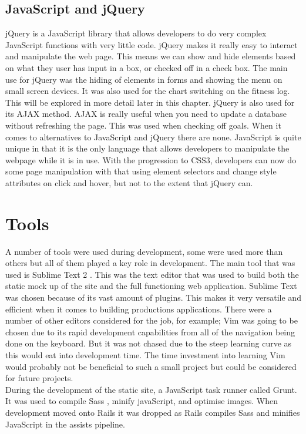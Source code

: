 \subsection{JavaScript and jQuery}
jQuery is a JavaScript library that allows developers to do very complex JavaScript functions with very little code. jQuery makes it really easy to interact and manipulate the web page. This means we can show and hide elements based on what they user has input in a box, or checked off in a check box. The main use for jQuery was the hiding of elements in forms and showing the menu on small screen devices. It was also used for the chart switching on the fitness log. This will be explored in more detail later in this chapter. jQuery is also used for its AJAX method. AJAX is really useful when you need to update a database without refreshing the page. This was used when checking off goals. When it comes to alternatives to JavaScript and jQuery there are none. JavaScript is quite unique in that it is the only language that allows developers to manipulate the webpage while it is in use. With the progression to CSS3, developers can now do some page manipulation with that using element selectors and change style attributes on click and hover, but not to the extent that jQuery can.\\

\section{Tools}
A number of tools were used during development, some were used more than others but all of them played a key role in development. The main tool that was used is Sublime Text 2 \citep{sublimetext:2011}. This was the text editor that was used to build both the static mock up of the site and the full functioning web application. Sublime Text was chosen because of its vast amount of plugins. This makes it very versatile and efficient when it comes to building productions applications. There were a number of other editors considered for the job, for example; Vim \citep{vim:2013} was going to be chosen due to its rapid development capabilities from all of the navigation being done on the keyboard. But it was not chased due to the steep learning curve as this would eat into development time. The time investment into learning Vim would probably not be beneficial to such a small project but could be considered for future projects.\\

During the development of the static site, a JavaScript task runner called Grunt. It was used to compile Sass \citep{sass:2006}, minify javaScript, and optimise images. When development moved onto Rails it was dropped as Rails compiles Sass and minifies JavaScript in the assists pipeline.\\


